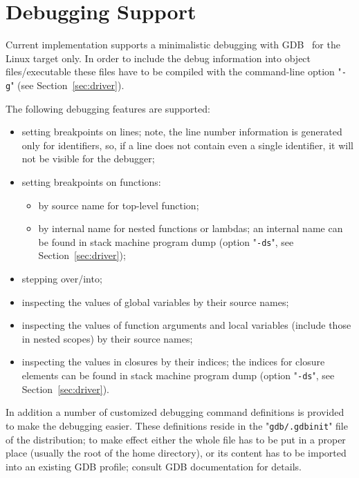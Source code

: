 \chapter{Debugging Support}
\label{sec:debugging}

Current implementation supports a minimalistic debugging with \textsc{GDB}~\cite{gdb} for the Linux target only.
In order to include the debug information into object files/executable these files
have to be compiled with the command-line option "\texttt{-g}" (see Section~\ref{sec:driver}).

The following debugging features are supported:

\begin{itemize}
\item setting breakpoints on lines; note, the line number information is generated only for identifiers, so, if a line does not contain even a single identifier, it
  will not be visible for the debugger;
\item setting breakpoints on functions:
  \begin{itemize}
    \item by source name for top-level function;
    \item by internal name for nested functions or lambdas; an internal name can be found in stack machine program dump (option "\texttt{-ds}", see Section~\ref{sec:driver});
  \end{itemize}
\item stepping over/into;
\item inspecting the values of global variables by their source names;
\item inspecting the values of function arguments and local variables (include those in nested scopes) by their source names;
\item inspecting the values in closures by their indices; the indices for closure elements can be found in stack machine
  program dump (option "\texttt{-ds}", see Section~\ref{sec:driver}).
\end{itemize}

In addition a number of customized debugging command definitions is provided to make the debugging easier. These definitions reside in the "\texttt{gdb/.gdbinit}"
file of the distribution; to make effect either the whole file has to be put in a proper place (usually the root of the home directory), or its content has to be
imported into an existing \textsc{GDB} profile; consult \textsc{GDB} documentation for details.

